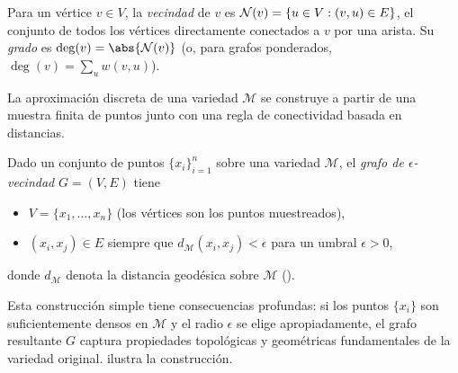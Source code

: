 \begin{definition}[Vecindad]
\label{def:graphs:neighbourhood}
Para un v\'ertice $v \in V$, la \emph{vecindad} de $v$ es
$\mathcal{N}(v) = \{u \in V : (v,u) \in E\}$, el conjunto de todos los v\'ertices
directamente conectados a $v$ por una arista. Su \emph{grado} es
$\deg(v) = \abs{\Nbr(v)}$ (o, para grafos ponderados,
$\deg(v) = \sum_{u} w(v,u)$).
\end{definition}

La aproximaci\'on discreta de una variedad $\mathcal{M}$ se construye a partir de
una muestra finita de puntos junto con una regla de conectividad basada en
distancias.

\begin{definition}
\label{def:graphs:epsilon}
Dado un conjunto de puntos $\{x_i\}_{i=1}^n$ sobre una variedad $\mathcal{M}$, el
\emph{grafo de $\epsilon$-vecindad} $G = (V, E)$ tiene
\begin{itemize}
  \item $V = \{x_1, \dots, x_n\}$ (los v\'ertices son los puntos muestreados),
  \item $(x_i, x_j) \in E$ siempre que $d_{\mathcal{M}}(x_i, x_j) < \epsilon$ para
        un umbral $\epsilon > 0$,
\end{itemize}
donde $d_{\mathcal{M}}$ denota la distancia geod\'esica sobre $\mathcal{M}$
().
\end{definition}

Esta construcci\'on simple tiene consecuencias profundas: si los puntos
$\{x_i\}$ son suficientemente densos en $\mathcal{M}$ y el radio $\epsilon$ se
elige apropiadamente, el grafo resultante $G$ captura propiedades topol\'ogicas y
geom\'etricas fundamentales de la variedad original. 
ilustra la construcci\'on.

